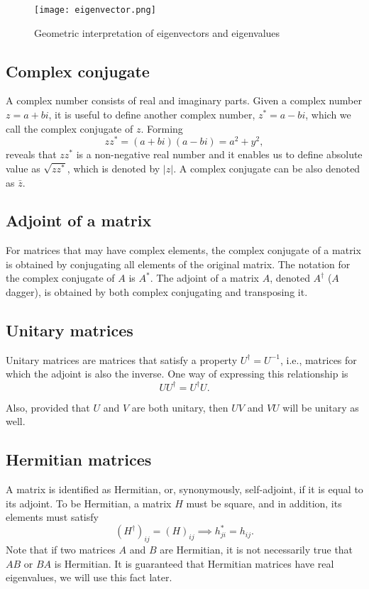 \begin{figure}[H]
  \centering
  \texttt{[image: eigenvector.png]}
  \caption{Geometric interpretation of eigenvectors and eigenvalues \cite{img:eigen}}
  \label{fig:eigen}
\end{figure} 


\subsection{Complex conjugate}
A complex number consists of real and imaginary parts. Given a complex number $z = a + bi$, it is useful to define another complex number, $z^{*} = a - bi$, which we call the complex conjugate of $z$. Forming
$$zz^{*} = (a + bi)(a - bi) = a^2 + y^2,$$ reveals that $zz^{*}$ is a non-negative real number and it enables us to define absolute value as $\sqrt{zz^{*}}$, which is denoted by $\lvert z \rvert$. A complex conjugate can be also denoted as $\bar{z}$.

\subsection{Adjoint of a matrix}
For matrices that may have complex elements, the complex conjugate of a matrix is obtained by conjugating all elements of the original matrix. The notation for the complex conjugate of $A$ is $A^*$. The adjoint of a matrix $A$, denoted $A^\dag$ ($A$ dagger), is obtained by both complex conjugating and transposing it.

\subsection{Unitary matrices}
Unitary matrices are matrices that satisfy a property $U^\dag = U^{-1}$, i.e., matrices for which the adjoint is also the inverse. One way of expressing this relationship is 
$$U U^{\dag} = U^{\dag} U.$$

Also, provided that $U$ and $V$ are both unitary, then $UV$ and $VU$ will be unitary as well.

\subsection{Hermitian matrices}
A matrix is identified as Hermitian, or, synonymously, self-adjoint, if it is equal to its adjoint. To be Hermitian, a matrix $H$ must be square, and in addition, its elements must satisfy $$(H^{\dag})_{ij} = (H)_{ij} \implies h^{*}_{ji} = h_{ij}.$$ Note that if two matrices $A$ and $B$ are Hermitian, it is not necessarily true that $AB$ or $BA$ is Hermitian. It is guaranteed that Hermitian matrices have real eigenvalues, we will use this fact later.

